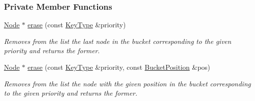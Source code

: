 \subsubsection*{Private Member Functions}
\begin{DoxyCompactItemize}
\item 
\hyperlink{structslb_1_1ext_1_1policy_1_1openList_1_1BucketedStdMap__T_a20be12bd955d752d2ef9e78f7577c738}{Node} $\ast$ \hyperlink{structslb_1_1ext_1_1policy_1_1openList_1_1BucketedStdMap__T_a98b3e08d0729abddbdc6a2934e21310d}{erase} (const \hyperlink{structslb_1_1ext_1_1policy_1_1openList_1_1BucketedStdMap__T_a1236fe314465155339798c0f9c4c5ca8}{Key\+Type} \&priority)
\begin{DoxyCompactList}\small\item\em Removes from the list the last node in the bucket corresponding to the given priority and returns the former. \end{DoxyCompactList}\item 
\hyperlink{structslb_1_1ext_1_1policy_1_1openList_1_1BucketedStdMap__T_a20be12bd955d752d2ef9e78f7577c738}{Node} $\ast$ \hyperlink{structslb_1_1ext_1_1policy_1_1openList_1_1BucketedStdMap__T_a48f1ff1b1897994d42dc438822ad761f}{erase} (const \hyperlink{structslb_1_1ext_1_1policy_1_1openList_1_1BucketedStdMap__T_a1236fe314465155339798c0f9c4c5ca8}{Key\+Type} \&priority, const \hyperlink{structslb_1_1ext_1_1policy_1_1openList_1_1BucketedStdMap__T_aa301ab635e2de1a7c0a67776e4239ec6}{Bucket\+Position} \&pos)
\begin{DoxyCompactList}\small\item\em Removes from the list the node with the given position in the bucket corresponding to the given priority and returns the former. \end{DoxyCompactList}\end{DoxyCompactItemize}
